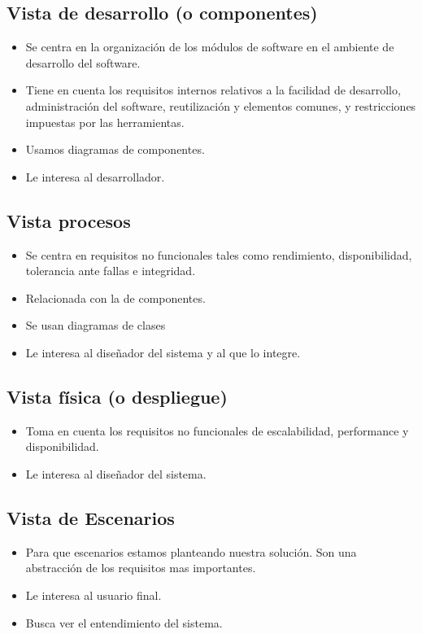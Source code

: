 \subsection*{Vista de desarrollo (o componentes)}
\begin{itemize}
\item Se centra en la organización de los módulos de software en el ambiente de desarrollo del software.
\item Tiene en cuenta los requisitos internos relativos a la facilidad de desarrollo, administración del software, reutilización y elementos comunes, y restricciones impuestas por las herramientas.
\item Usamos diagramas de componentes.
\item Le interesa al desarrollador.
\end{itemize}



\subsection*{Vista procesos}
\begin{itemize}
\item Se centra en requisitos no funcionales tales como rendimiento, disponibilidad, tolerancia ante fallas e integridad.
\item Relacionada con la de componentes.
\item Se usan diagramas de clases
\item Le interesa al diseñador del sistema y al que lo integre.
\end{itemize}


\subsection*{Vista física (o despliegue)}
\begin{itemize}
\item Toma en cuenta los requisitos no funcionales de escalabilidad, performance y disponibilidad.
\item Le interesa al diseñador del sistema.
\end{itemize}


\subsection*{Vista de Escenarios}
\begin{itemize}
\item Para que escenarios estamos planteando nuestra solución. Son una abstracción de los requisitos mas importantes.
\item Le interesa al usuario final.
\item Busca ver el entendimiento del sistema.
\end{itemize}

